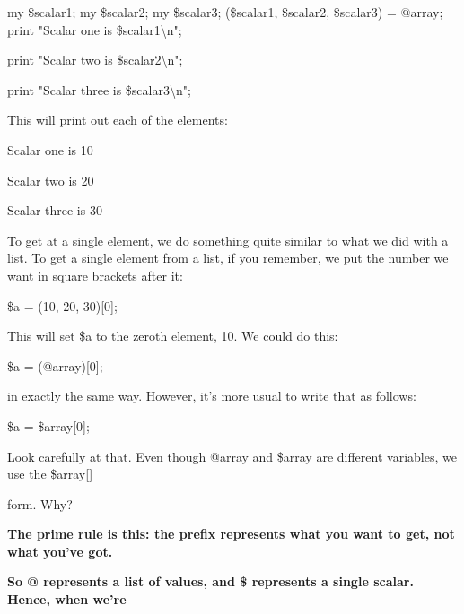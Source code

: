\documentclass[a4paper,11pt]{book}
\begin{document}
\noindent 

\noindent my \$scalar1; my \$scalar2; my \$scalar3; (\$scalar1, \$scalar2, \$scalar3) = @array; print "Scalar one is \$scalar1\textbackslash n";

\noindent print "Scalar two is \$scalar2\textbackslash n";

\noindent print "Scalar three is \$scalar3\textbackslash n";

\noindent 

\noindent This will print out each of the elements:

\noindent 

\noindent Scalar one is 10

\noindent Scalar two is 20

\noindent Scalar three is 30

\noindent 

\noindent To get at a single element, we do something quite similar to what we did with a list. To get a single element from a list, if you remember, we put the number we want in square brackets after it:

\noindent 

\noindent 

\noindent \$a = (10, 20, 30)[0];

\noindent 

\noindent This will set \$a to the zeroth element, 10. We could do this:

\noindent 

\noindent 

\noindent \$a = (@array)[0];

\noindent 

\noindent in exactly the same way. However, it's more usual to write that as follows:

\noindent 

\noindent 

\noindent \$a = \$array[0];

\noindent 

\noindent Look carefully at that. Even though @array and \$array are different variables, we use the \$array[]

\noindent form. Why?

\noindent 

\noindent 

\noindent \textbf{The prime rule is this: the prefix represents what you want to get, not what you've got.}

\noindent \textbf{So @ represents a list of values, and \$ represents a single scalar. Hence, when we're}
\end{document}
